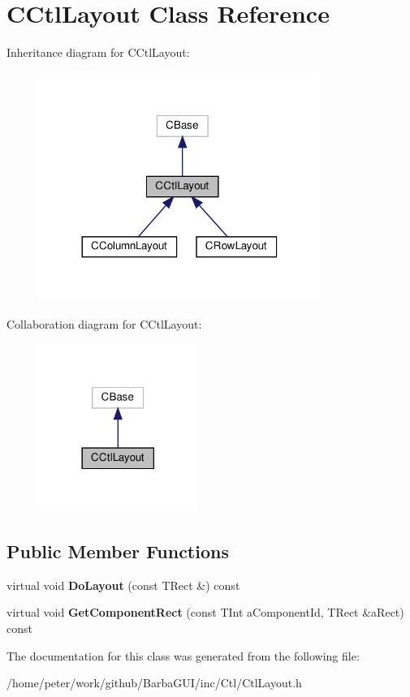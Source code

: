 \hypertarget{classCCtlLayout}{}\section{C\+Ctl\+Layout Class Reference}
\label{classCCtlLayout}


Inheritance diagram for C\+Ctl\+Layout\+:
\nopagebreak
\begin{figure}[H]
\begin{center}
\leavevmode
\includegraphics[width=260pt]{classCCtlLayout__inherit__graph}
\end{center}
\end{figure}


Collaboration diagram for C\+Ctl\+Layout\+:
\nopagebreak
\begin{figure}[H]
\begin{center}
\leavevmode
\includegraphics[width=146pt]{classCCtlLayout__coll__graph}
\end{center}
\end{figure}
\subsection*{Public Member Functions}
\begin{DoxyCompactItemize}
\item 
\mbox{\label{classCCtlLayout_ab1bc3fda6d4d757a2a2216025376538d}} 
virtual void {\bfseries Do\+Layout} (const T\+Rect \&) const
\item 
\mbox{\label{classCCtlLayout_ae1000493c85b64d4bb8fada61dcea588}} 
virtual void {\bfseries Get\+Component\+Rect} (const T\+Int a\+Component\+Id, T\+Rect \&a\+Rect) const
\end{DoxyCompactItemize}


The documentation for this class was generated from the following file\+:\begin{DoxyCompactItemize}
\item 
/home/peter/work/github/\+Barba\+G\+U\+I/inc/\+Ctl/Ctl\+Layout.\+h\end{DoxyCompactItemize}
